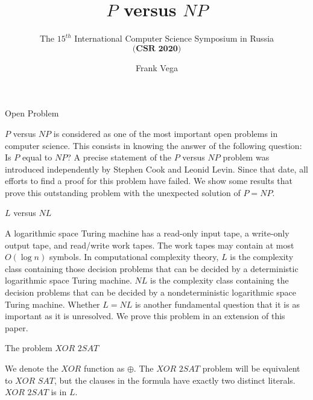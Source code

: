 \documentclass[11pt]{beamer}
\begin{document}
\title{$P$ versus $NP$}

\subtitle{The $15^{th}$ International Computer Science Symposium in Russia\\
 $\textbf{(CSR 2020)}$}

\author{Frank Vega}



\maketitle

\begin{frame}{Open Problem}

$P$ versus $NP$ is considered as one of the most important open problems in computer science. This consists in knowing the answer of the following question: Is $P$ equal to $NP$? A precise statement of the $P$ versus $NP$ problem was introduced independently by Stephen Cook and Leonid Levin. Since that date, all efforts to find a proof for this problem have failed. We show some results that prove this outstanding problem with the unexpected solution of $P = NP$.

\end{frame}


\begin{frame}{$L$ versus $NL$}

A logarithmic space Turing machine has a read-only input tape, a write-only output tape, and read/write work tapes. The work tapes may contain at most $O(\log n)$ symbols. In computational complexity theory, $L$ is the complexity class containing those decision problems that can be decided by a deterministic logarithmic space Turing machine. $NL$ is the complexity class containing the decision problems that can be decided by a nondeterministic logarithmic space Turing machine. Whether $L = NL$ is another fundamental question that it is as important as it is unresolved. We prove this problem in an extension of this paper.

\end{frame}

\begin{frame}{The problem $\textit{XOR 2SAT}$}

We denote the $XOR$ function as $\oplus$. The $\textit{XOR 2SAT}$ problem will be equivalent to $\textit{XOR SAT}$, but the clauses in the formula have exactly two distinct literals. $\textit{XOR 2SAT}$ is in $L$.

\end{frame}
\end{document}
